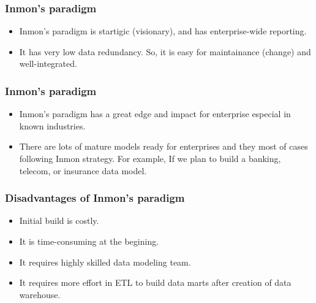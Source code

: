 \begin{frame}
	\frametitle{Inmon's paradigm}
	\begin{itemize}[<+->]
		\item Inmon’s paradigm is startigic (visionary), and has enterprise-wide reporting.
		\item It has very low data redundancy. So, it is easy for maintainance (change) and well-integrated.

	\end{itemize}
	
\end{frame}
\begin{frame}
	\frametitle{Inmon's paradigm}
	\begin{itemize}[<+->]
		\item Inmon's paradigm has a great edge and impact for enterprise especial in known industries.
		\item There are lots of mature models ready for enterprises and they most of cases following Inmon strategy.
		 For example, If we plan to build a banking, telecom, or insurance data model.
		
	\end{itemize}
	
\end{frame}
\begin{frame}
	\frametitle{Disadvantages of Inmon's paradigm}
	\begin{itemize}[<+->]
		\item Initial build is costly.
		\item It is time-consuming at the begining. 
		\item It requires highly skilled data modeling team.
		\item It requires more effort in ETL to build data marts after creation of data warehouse. 
	\end{itemize}
	
\end{frame}
